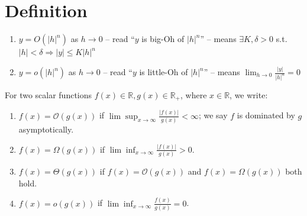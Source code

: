 \documentclass[11pt]{elegantbook}
\begin{document}
\section{Definition}
\begin{definition}["$O$" and "$o$"]
    \normalfont
    \begin{enumerate}
        \item $y = O(|h|^n)$ as $h \rightarrow 0$ -- read “$y$ is big-Oh of $|h|^n$” -- means $\exists K, \delta > 0$ s.t. $|h| < \delta \Rightarrow |y| \leq K|h|^n$
        \item $y = o(|h|^n)$ as $h \rightarrow 0$ -- read “$y$ is little-Oh of $|h|^n$” -- means $\lim_{h \rightarrow 0}\frac{|y|}{|h|^n}=0$
    \end{enumerate}
\end{definition}
\begin{center}
\end{center}
For two scalar functions $f(x)\in \mathbb{R}, g(x)\in \mathbb{R}_+$, where $x\in \mathbb{R}$, we write:
\begin{enumerate}
    \item $f(x)=\mathcal{O}(g(x))$ if $\lim \sup_{x \rightarrow	\infty}\frac{|f(x)|}{g(x)}<\infty$; we say $f$ is dominated by $g$ asymptotically.
    \item $f(x)=\Omega(g(x))$ if $\lim \inf_{x \rightarrow \infty}\frac{|f(x)|}{g(x)}>0$.
    \item $f(x)=\Theta (g(x))$ if $f(x)=\mathcal{O}(g(x))$ and $f(x)=\Omega(g(x))$ both hold.
    \item $f(x)=o(g(x))$ if $\lim \inf_{x \rightarrow \infty}\frac{f(x)}{g(x)}=0$.
\end{enumerate}
\end{document}

